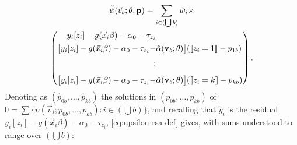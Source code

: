 \documentclass{article}
\DeclarePairedDelimiter{\indicator}{\llbracket}{\rrbracket}
\newcommand{\owt}[1][{[z_{i}]}]{\ensuremath{\check{w}_{i#1}}}
\newcommand{\absorbInterceptsEF}{\upsilon}
\begin{document}
\begin{multline}
  \breve{\psi}(\vec{v}_{b}; \theta, \mathbf{p}) =
\sum_{i \in (\bigcup b)}\owt[] \times  \\
\left(
  \begin{aligned}                                               
    y_{i}[z_{i}]
    -
    g(\vec{x}_{i}\beta)-{\alpha}_{0} - \tau_{z_{i}}&\\
    \big[y_{i}[z_{i}]
    -
    g(\vec{x}_{i}\beta)-\alpha_{0}-\tau_{z_{i}} - &\hat{\alpha}(\mathbf{v}_{b}; \theta)\big]
    (
    \indicator{z_{i}=1} - p_{1b})\\
    \vdots \\
    {}\big[y_{i}[z_{i}]
    - g(\vec{x}_{i}\beta) - \alpha_{0}-
    \tau_{z_{i}} - &\hat{\alpha}(\mathbf{v}_{b}; \theta)\big]
    (\indicator{z_{i}=k} - p_{kb})\\
  \end{aligned}
\right) . \label{eq:upsilon-rsa-def}
\end{multline}
Denoting as $(\hat{p}_{0b}, \ldots, \hat{p}_{kb})$ the solutions in
$({p}_{0b}, \ldots, {p}_{kb})$ of
$0= \sum \{\absorbInterceptsEF(\vec{v}_{i}; {p}_{0b}, \ldots,
{p}_{kb}) : i \in (\bigcup b)\}$, and recalling that  $\tilde{y}_{i}$
is the residual
$y_{i}[z_{i}]
    -
    g(\vec{x}_{i}\beta)-\alpha_{0}-\tau_{z_{i}}$, 
\eqref{eq:upsilon-rsa-def} gives, with sums understood to range over
$(\bigcup b)$:
\end{document}
